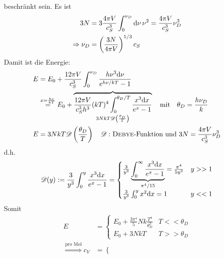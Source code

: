 \begin{enumerate}[A)]
    beschränkt sein. Es ist
    \begin{equation}
        \begin{split}
            3 N &= 3 \frac{4 \pi V}{c_S^3} \int_{0}^{\nu_D} \mathrm{d} \nu \, \nu^2 = \frac{4 \pi V}{c_S^3} \nu_D^3 \\
            \Rightarrow \nu_D &= \left( \frac{3 N}{4 \pi V} \right)^{1/3} c_S 
        \end{split}
    \end{equation}
    Damit ist die Energie:
    \begin{equation}
        \begin{split}
            E &= E_0 + \frac{12 \pi V}{c_S^3} \int_{0}^{\nu_D} \frac{h \nu^3 \mathrm{d} \nu}{e^{h \nu / k T} - 1} \\
            &\overset{x=\frac{h \nu}{kT}}{=} E_0 + \overbrace{\frac{12 \pi V}{c_S^3 h^3} (kT)^4 \int_{0}^{\theta_D / T} \frac{x^3 \mathrm{d} x}{e^x - 1}}_{3 N k T \mathscr{D} \left( \frac{\theta_D}{T} \right) } \quad \text{mit} \quad \theta_D = \frac{h \nu_D}{k} \\
            E &= 3 N k T \mathscr{D} \left( \frac{\theta_D}{T} \right) \quad \mathscr{D}: \text{\textsc{Debye}-Funktion und } 3N = \frac{4 \pi V}{c_S^3} \nu_D^3 \\
        \end{split}
    \end{equation}
    d.h.
    \begin{equation}
        \mathscr{D}(y) := \frac{3}{y^3} \int_{0}^{y} \frac{x^3 \mathrm{d} x}{e^x - 1} =
        \begin{cases}
            \frac{3}{y^3} \underbrace{\int_{0}^{\infty} \frac{x^3 \mathrm{d} x}{e^x - 1}}_{\pi^4 / 15} = \frac{\pi^4}{5 y^3} & y >> 1 \\
            \frac{3}{y^3} \int_0^y x^2 \mathrm{d} x = 1 & y << 1
        \end{cases}
    \end{equation}
    Somit
    \begin{equation}
        \begin{split}
            E &=
            \begin{cases}
                E_0 + \frac{3 \pi^4}{5} N k \frac{T^4}{\theta_D^3} & T << \theta_D\\
                E_0 + 3 N k T & T >> \theta_D
            \end{cases} \\
            \overset{\text{pro Mol}}{\Rightarrow} c_V &=
            \begin{cases}

\end{cases}
\end{split}
\end{equation}
\end{enumerate}
